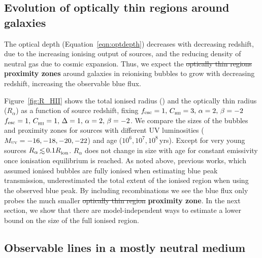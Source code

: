 \documentclass[fleqn,usenatbib]{mnras}
\providecommand{\DIFadd}[1]{{\protect\color{Green} \bf #1}} %
\providecommand{\DIFdel}[1]{{\protect\color{lightgray} \footnotesize \sout{#1}}} %
\providecommand{\DIFaddbegin}{} %
\providecommand{\DIFaddend}{} %
\providecommand{\DIFdelbegin}{} %
\providecommand{\DIFdelend}{} %
\newcommand{\DIFscaledelfig}{0.5}
\newlength{\DIFdelgraphicswidth} %
\newlength{\DIFdelgraphicsheight} %
\newcommand{\DIFaddincludegraphics}[2][]{{\color{blue}\fbox{\DIFOincludegraphics[#1]{#2}}}} %
\newcommand{\DIFdelincludegraphics}[2][]{%
\sbox{\DIFdelgraphicsbox}{\DIFOincludegraphics[#1]{#2}}%
\settoboxwidth{\DIFdelgraphicswidth}{\DIFdelgraphicsbox} %
\settoboxtotalheight{\DIFdelgraphicsheight}{\DIFdelgraphicsbox} %
\scalebox{\DIFscaledelfig}{%
\parbox[b]{\DIFdelgraphicswidth}{\usebox{\DIFdelgraphicsbox}\\[-\baselineskip] \rule{\DIFdelgraphicswidth}{0em}}\llap{\resizebox{\DIFdelgraphicswidth}{\DIFdelgraphicsheight}{%
\setlength{\unitlength}{\DIFdelgraphicswidth}%
\begin{picture}(1,1)%
\thicklines\linethickness{2pt} %
{\color[rgb]{1,0,0}\put(0,0){\framebox(1,1){}}}%
{\color[rgb]{1,0,0}\put(0,0){\line( 1,1){1}}}%
{\color[rgb]{1,0,0}\put(0,1){\line(1,-1){1}}}%
\end{picture}%
}\hspace*{3pt}}} %
} %
\DeclareRobustCommand{\DIFaddbegin}{\DIFOaddbegin \let\includegraphics\DIFaddincludegraphics} %
\DeclareRobustCommand{\DIFaddend}{\DIFOaddend \let\includegraphics\DIFOincludegraphics} %
\DeclareRobustCommand{\DIFdelbegin}{\DIFOdelbegin \let\includegraphics\DIFdelincludegraphics} %
\DeclareRobustCommand{\DIFdelend}{\DIFOaddend \let\includegraphics\DIFOincludegraphics} %
\begin{document}
\subsection{Evolution of optically thin regions around galaxies}
\label{sec:results_opticallythin}

The \lya optical depth (Equation~\ref{eqn:optdepth}) decreases with decreasing redshift, due to the increasing ionising output of sources, and the reducing density of neutral gas due to cosmic expansion. Thus, we expect the \DIFdelbegin \DIFdel{optically thin regions }\DIFdelend \DIFaddbegin \DIFadd{proximity zones }\DIFaddend around galaxies in reionising bubbles to grow with decreasing redshift, increasing the observable blue flux.

Figure~\ref{fig:R_HII} shows the total ionised radius (\Rion) and the optically thin radius ($R_\alpha$) as a function of source redshift, fixing \DIFdelbegin \DIFdel{$\fesc=1, \, \clump=3, \, \alpha=2, \, \beta=-2$}\DIFdelend \DIFaddbegin \DIFadd{$\fesc=1, \, \clump=1, \, \Delta=1, \, \alpha=2, \, \beta=-2$}\DIFaddend . We compare the sizes of the bubbles and proximity zones for sources with different UV luminosities ($\MUV = -16, -18, -20, -22$) and age ($10^6, 10^7, 10^8$\,yrs). Except for very young sources $R_\alpha \simlt 0.1\Rion$. $R_\alpha$ does not change in size with age for constant emissivity once ionisation equilibrium is reached. 
As noted above, previous works, which assumed ionised bubbles are fully ionised when estimating blue peak transmission, underestimated the total extent of the ionised region when using the observed blue \lya peak. By including recombinations we see the blue \lya flux only probes the much smaller \DIFdelbegin \DIFdel{optically thin region}\DIFdelend \DIFaddbegin \DIFadd{proximity zone}\DIFaddend . In the next section, we show that there are model-independent ways to estimate a lower bound on the size of the full ionised region. 

\subsection{Observable \lya lines in a mostly neutral medium}
\label{sec:results_minDV}
\end{document}
